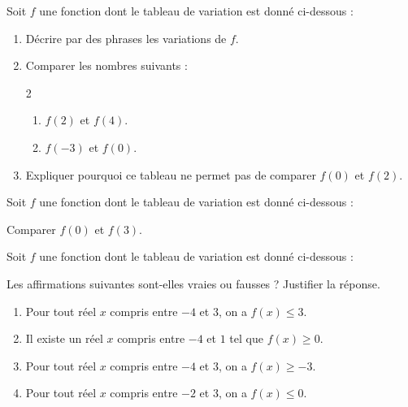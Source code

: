 \exo

Soit $f$ une fonction dont le tableau de variation est donné ci-dessous :
\begin{center}
\end{center}
\begin{enumerate}
\item Décrire par des phrases les variations de $f$.
\item Comparer les nombres suivants :
\vspace{-12pt}
\setlength{\columnsep}{1cm}
\setlength{\columnseprule}{0pt}
\begin{multicols}{2}
\begin{enumerate}
\item $f(2)$ et $f(4)$.
\item $f(-3)$ et $f(0)$.
\end{enumerate}
\end{multicols}
\vspace{-12pt}
\item Expliquer pourquoi ce tableau ne permet pas de comparer $f(0)$ et $f(2)$.
\end{enumerate}

\exo

Soit $f$ une fonction dont le tableau de variation est donné ci-dessous :
\begin{center}
\end{center}
Comparer $f(0)$ et $f(3)$.

\exo

Soit $f$ une fonction dont le tableau de variation est donné ci-dessous :
\begin{center}
\end{center}
Les affirmations suivantes sont-elles vraies ou fausses ? Justifier la réponse.
\begin{enumerate}
\item Pour tout réel $x$ compris entre $-4$ et $3$, on a $f(x)\leqslant 3$.
\item Il existe un réel $x$ compris entre $-4$ et $1$ tel que $f(x)\geqslant 0$.
\item Pour tout réel $x$ compris entre $-4$ et $3$, on a $f(x)\geqslant -3$.
\item Pour tout réel $x$ compris entre $-2$ et $3$, on a $f(x)\leqslant 0$.
\end{enumerate}


